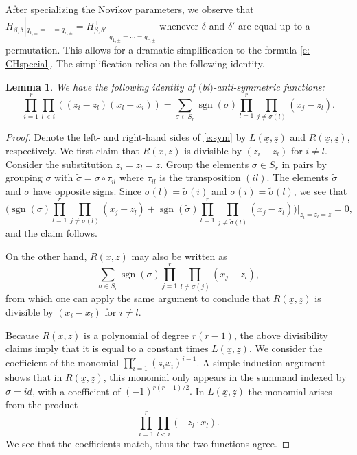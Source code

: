 \documentclass[pdftex]{sigma}
\newtheorem{Lemma}[Theorem]{Lemma}
\numberwithin{equation}{section}
\newcommand{\op}[1]{\operatorname{#1}}
\newcommand{\z}{z}
\newcommand{\x}{x}
\begin{document}
After specializing the Novikov parameters, we observe that
$H^{{\pm}}_{\beta, \delta}|_{q_{1, \pm} = \cdots =q_{r, \pm}} = H^{{\pm}}_{\beta, \delta '}|_{q_{1, \pm} = \cdots =q_{r, \pm}}$
whenever $\delta$ and $\delta '$ are equal up to a permutation. This allows for a dramatic simplification to the formula \eqref{e: CHspecial}. The simplification relies on the following identity.
\begin{Lemma}\label{l:sym}
We have the following identity of $($bi$)$-anti-symmetric functions:
\begin{equation}\label{e:sym}
\prod_{i=1}^r \prod_{l<i} ((\z_i - \z_l)(\x_l - \x_i) ) = \sum_{\sigma \in S_r} \op{sgn}(\sigma) \prod_{l=1}^r \prod_{j \neq \sigma(l)} (\x_j - \z_l).
\end{equation}
\end{Lemma}

\begin{proof}
Denote the left- and right-hand sides of \eqref{e:sym} by $L(\underline x, \underline z)$ and $R(\underline x, \underline z)$, respectively.
We first claim that $R(\underline x, \underline z)$ is divisible by $(z_i - z_l)$ for $i \neq l$. Consider the substitution $z_i = z_l = z$.
Group the elements $\sigma \in S_r$ in pairs by grouping $\sigma$ with $\tilde \sigma = \sigma \circ \tau_{il}$ where $\tau_{il}$ is the transposition $(il)$. The elements $\tilde \sigma$ and $\sigma$ have opposite signs. Since $\sigma(l) = \tilde \sigma(i)$ and $\sigma(i) = \tilde \sigma(l)$, we see that
\[
\Biggl(\op{sgn}(\sigma) \prod_{l=1}^r \prod_{j \neq \sigma(l)} (\x_j - \z_l) + \op{sgn}(\tilde \sigma) \prod_{l=1}^r \prod_{j \neq \tilde \sigma(l)} (\x_j - \z_l)\Biggr)\bigg|_{z_i = z_l = z} = 0,
\]
and the claim follows.

On the other hand, $R(\underline x, \underline z)$ may also be written as
\[
\sum_{\sigma \in S_r} \op{sgn}(\sigma) \prod_{j=1}^r \prod_{l \neq \sigma(j)} (\x_j - \z_l),
\]
from which one can apply the same argument to conclude that $R(\underline x, \underline z)$ is divisible by $(x_i - x_l)$ for $i \neq l$.

Because $R(\underline x, \underline z)$ is a polynomial of degree $r(r-1)$, the above divisibility claims imply that it is equal to a constant times $L(\underline x, \underline z)$. We consider the coefficient of the monomial
$\prod_{i=1}^r (z_i x_i)^{i-1}$. A simple induction argument shows that in $R(\underline x, \underline z)$, this monomial only appears in the summand indexed by $\sigma = id$, with a coefficient of $(-1)^{r(r-1)/2}.$ In $L(\underline x, \underline z)$ the monomial arises from the product
\[
\prod_{i=1}^r \prod_{l<i} (- \z_l \cdot \x_l ).
\]
We see that the coefficients match, thus the two functions agree.
\end{proof}
\end{document}
